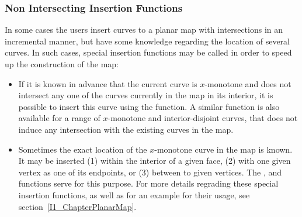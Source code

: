 
\subsubsection{Non Intersecting Insertion Functions}

In some cases the users insert curves to a planar map with intersections
in an incremental manner, but have some knowledge regarding the location
of several curves. In such cases, special insertion functions may be called
in order to speed up the construction of the map:
\begin{itemize}
\item If it is known in advance that the current curve is $x$-monotone and does
not intersect any one of the curves currently in the map in its interior,
it is possible to insert this curve using the 
function. A similar function is also available for a range of $x$-monotone
and interior-disjoint curves, that does not induce any intersection with the
existing curves in the map.
\item Sometimes the exact location of the $x$-monotone curve in the map is known. It may be inserted (1) within the interior of a given face, (2) with one given vertex as one of its endpoints, or (3) between to given vertices. The ,  and  functions serve for this purpose. For more details regrading these special insertion functions, as well as for an example for their usage, see section~\ref{I1_ChapterPlanarMap}.
\end{itemize}

